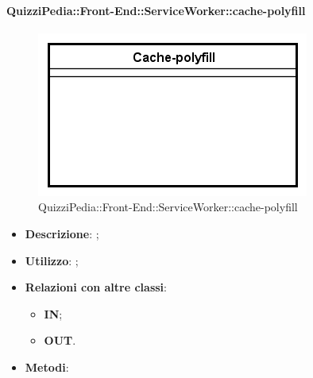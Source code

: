 \paragraph[QuizziPedia::Front-End::ServiceWorker::cache-polyfill]{QuizziPedia::Front-End::ServiceWorker::cache-polyfill}
\begin{figure} [ht]
	\centering
	\includegraphics[scale=0.80]{UML/Classi/Front-End/QuizziPedia_Front-End_ServiceWorker_cache-polyfill.png}
	\caption{QuizziPedia::Front-End::ServiceWorker::cache-polyfill}
\end{figure} \FloatBarrier
\begin{itemize}
	\item \textbf{Descrizione}: ;
	\item \textbf{Utilizzo}: ;
	\item \textbf{Relazioni con altre classi}:
	\begin{itemize}
		\item \textbf{IN};
		\item \textbf{OUT}.
	\end{itemize}
	\item \textbf{Metodi}:
\end{itemize}

